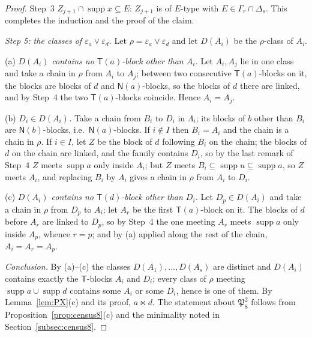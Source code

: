 \documentclass[11pt]{amsart}
\theoremstyle{definition}
\newcommand{\supp}{\operatorname{supp}}
\newcommand{\T}{\mathsf{T}}
\newcommand{\N}{\mathsf{N}}
\begin{document}
\begin{proof}
Step~3 $Z_{j+1}\cap\supp x\subseteq E$: $Z_{j+1}$ is of $E$-type with $E\in\Gamma_r\cap\Delta_s$. This completes the induction and the proof of the claim.

\smallskip
\emph{Step 5: the classes of $\varepsilon_a\vee\varepsilon_d$.} Let $\rho=\varepsilon_a\vee\varepsilon_d$ and let $D(A_i)$ be the $\rho$-class of $A_i$.

(a) \emph{$D(A_i)$ contains no $\T(a)$-block other than $A_i$.} Let $A_i,A_j$ lie in one class and take a chain in $\rho$ from $A_i$ to $A_j$; between two consecutive $\T(a)$-blocks on it, the blocks are blocks of $d$ and $\N(a)$-blocks, so the blocks of $d$ there are linked, and by Step~4 the two $\T(a)$-blocks coincide. Hence $A_i=A_j$.

(b) \emph{$D_i\in D(A_i)$.} Take a chain from $B_i$ to $D_i$ in $\Lambda_i$; its blocks of $b$ other than $B_i$ are $\N(b)$-blocks, i.e.\ $\N(a)$-blocks. If $i\notin I$ then $B_i=A_i$ and the chain is a chain in $\rho$. If $i\in I$, let $Z$ be the block of $d$ following $B_i$ on the chain; the blocks of $d$ on the chain are linked, and the family contains $D_i$, so by the last remark of Step~4 $Z$ meets $\supp a$ only inside $A_i$; but $Z$ meets $B_i\subseteq\supp u\subseteq\supp a$, so $Z$ meets $A_i$, and replacing $B_i$ by $A_i$ gives a chain in $\rho$ from $A_i$ to $D_i$.

(c) \emph{$D(A_i)$ contains no $\T(d)$-block other than $D_i$.} Let $D_p\in D(A_i)$ and take a chain in $\rho$ from $D_p$ to $A_i$; let $A_r$ be the first $\T(a)$-block on it. The blocks of $d$ before $A_r$ are linked to $D_p$, so by Step~4 the one meeting $A_r$ meets $\supp a$ only inside $A_p$, whence $r=p$; and by (a) applied along the rest of the chain, $A_i=A_r=A_p$.

\emph{Conclusion.} By (a)--(c) the classes $D(A_1),\dots,D(A_s)$ are distinct and $D(A_i)$ contains exactly the $\T$-blocks $A_i$ and $D_i$; every class of $\rho$ meeting $\supp a\cup\supp d$ contains some $A_i$ or some $D_i$, hence is one of them. By Lemma~\ref{lem:PX}(c) and its proof, $a\bowtie d$. The statement about $\mathfrak P_8^2$ follows from Proposition~\ref{prop:census8}(c) and the minimality noted in Section~\ref{subsec:census8}.
\end{proof}
\end{document}
